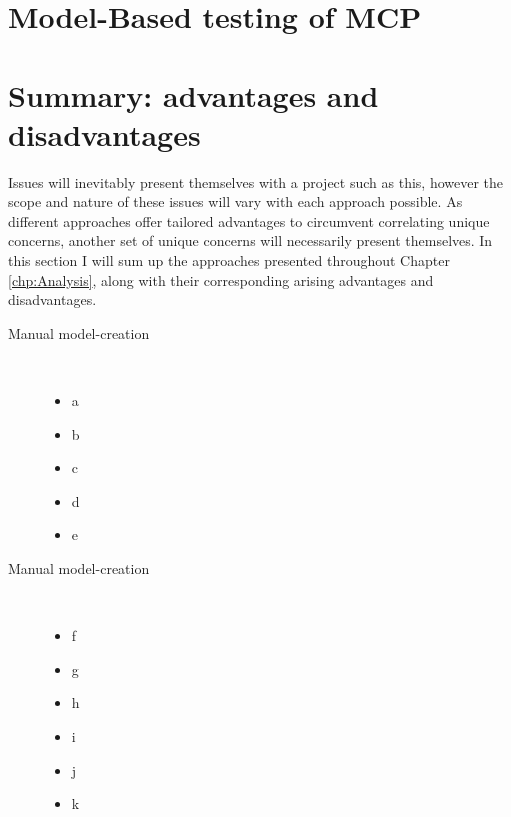 \section{Model-Based testing of MCP} 

\section{Summary: advantages and disadvantages} 

Issues will inevitably present themselves with a project such as this, however the scope and nature of these issues will vary with each approach possible. As different approaches offer tailored advantages to circumvent correlating unique concerns, another set of unique concerns will necessarily present themselves. In this section I will sum up the approaches presented throughout Chapter \ref{chp:Analysis}, along with their corresponding arising advantages and disadvantages.
\begin{description}
	\item[Manual model-creation]\ \\
	\begin{itemize}
		\item a
		\item b
		\item c
	\end{itemize}
	\begin{itemize}
		\item d
		\item e
	\end{itemize}
	\item[Manual model-creation]\ \\
	\begin{itemize}
		\item f
		\item g
		\item h
	\end{itemize}
	\begin{itemize}
		\item i
		\item j
		\item k
	\end{itemize}
\end{description}


